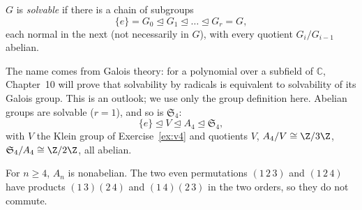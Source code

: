 \begin{definition}
$G$ is \emph{solvable} if there is a chain of subgroups
\[
\{e\}=G_0\trianglelefteq G_1\trianglelefteq\dots\trianglelefteq G_r=G,
\]
each normal in the next (not necessarily in $G$), with every quotient $G_i/G_{i-1}$ abelian.
\end{definition}

The name comes from Galois theory: for a polynomial over a subfield of $\mathbb C$, Chapter~10 will prove that solvability by radicals is equivalent to solvability of its Galois group. This is an outlook; we use only the group definition here. Abelian groups are solvable ($r=1$), and so is $\mathfrak S_4$:
\[
\{e\}\trianglelefteq V\trianglelefteq A_4\trianglelefteq\mathfrak S_4,
\]
with $V$ the Klein group of Exercise~\ref{ex:v4} and quotients $V$, $A_4/V\cong\Z/3\Z$, $\mathfrak S_4/A_4\cong\Z/2\Z$, all abelian.

For $n\ge4$, $A_n$ is nonabelian. The two even permutations
$(1\,2\,3)$ and $(1\,2\,4)$ have products $(1\,3)(2\,4)$ and
$(1\,4)(2\,3)$ in the two orders, so they do not commute.


